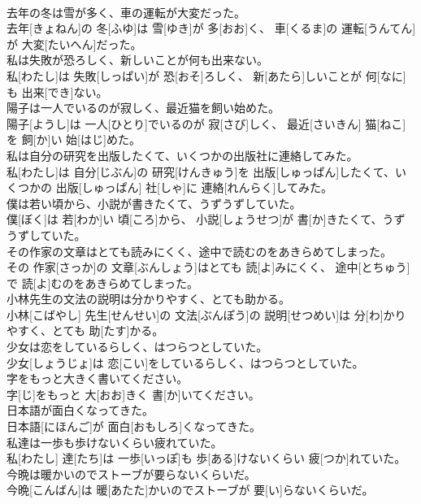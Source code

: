 \documentclass[8pt]{extreport}
\begin{document}
\begin{CJK}{UTF8}{min}
\\	去年の冬は雪が多く、車の運転が大変だった。	
\\	去年[きょねん]の 冬[ふゆ]は 雪[ゆき]が 多[おお]く、 車[くるま]の 運転[うんてん]が 大変[たいへん]だった。
\\	私は失敗が恐ろしく、新しいことが何も出来ない。	
\\	私[わたし]は 失敗[しっぱい]が 恐[おそ]ろしく、 新[あたら]しいことが 何[なに]も 出来[でき]ない。
\\	陽子は一人でいるのが寂しく、最近猫を飼い始めた。	
\\	陽子[ようし]は 一人[ひとり]でいるのが 寂[さび]しく、 最近[さいきん] 猫[ねこ]を 飼[か]い 始[はじ]めた。
\\	私は自分の研究を出版したくて、いくつかの出版社に連絡してみた。	
\\	私[わたし]は 自分[じぶん]の 研究[けんきゅう]を 出版[しゅっぱん]したくて、いくつかの 出版[しゅっぱん] 社[しゃ]に 連絡[れんらく]してみた。
\\	僕は若い頃から、小説が書きたくて、うずうずしていた。	
\\	僕[ぼく]は 若[わか]い 頃[ころ]から、 小説[しょうせつ]が 書[か]きたくて、うずうずしていた。
\\	その作家の文章はとても読みにくく、途中で読むのをあきらめてしまった。	
\\	その 作家[さっか]の 文章[ぶんしょう]はとても 読[よ]みにくく、 途中[とちゅう]で 読[よ]むのをあきらめてしまった。
\\	小林先生の文法の説明は分かりやすく、とても助かる。	
\\	小林[こばやし] 先生[せんせい]の 文法[ぶんぽう]の 説明[せつめい]は 分[わ]かりやすく、とても 助[たす]かる。
\\	少女は恋をしているらしく、はつらつとしていた。	
\\	少女[しょうじょ]は 恋[こい]をしているらしく、はつらつとしていた。
\\	字をもっと大きく書いてください。	
\\	字[じ]をもっと 大[おお]きく 書[か]いてください。
\\	日本語が面白くなってきた。	
\\	日本語[にほんご]が 面白[おもしろ]くなってきた。
\\	私達は一歩も歩けないくらい疲れていた。	
\\	私[わたし] 達[たち]は 一歩[いっぽ]も 歩[ある]けないくらい 疲[つか]れていた。
\\	今晩は暖かいのでストーブが要らないくらいだ。	
\\	今晩[こんばん]は 暖[あたた]かいのでストーブが 要[い]らないくらいだ。

\end{CJK}
\end{document}
